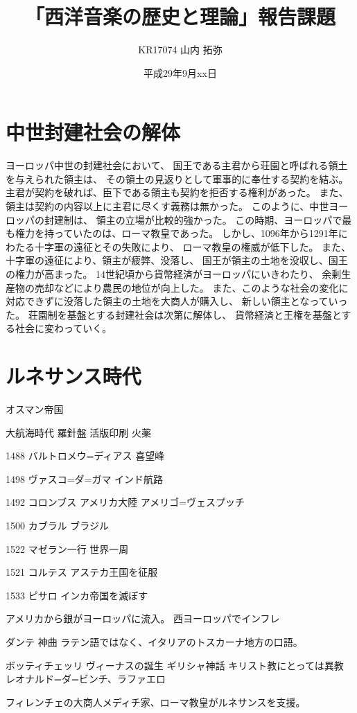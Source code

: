 \documentclass[a4j]{jarticle}
\title{「西洋音楽の歴史と理論」報告課題}
\author{KR17074 山内 拓弥}
\date{平成29年9月xx日}
\begin{document}

\section{中世封建社会の解体}

ヨーロッパ中世の封建社会において、
国王である主君から荘園と呼ばれる領土を与えられた領主は、
その領土の見返りとして軍事的に奉仕する契約を結ぶ。
主君が契約を破れば、臣下である領主も契約を拒否する権利があった。
また、領主は契約の内容以上に主君に尽くす義務は無かった。
このように、中世ヨーロッパの封建制は、
領主の立場が比較的強かった。
この時期、ヨーロッパで最も権力を持っていたのは、ローマ教皇であった。
しかし、1096年から1291年にわたる十字軍の遠征とその失敗により、
ローマ教皇の権威が低下した。
また、十字軍の遠征により、領主が疲弊、没落し、
国王が領主の土地を没収し、国王の権力が高まった。
14世紀頃から貨幣経済がヨーロッパにいきわたり、
余剰生産物の売却などにより農民の地位が向上した。
また、このような社会の変化に対応できずに没落した領主の土地を大商人が購入し、
新しい領主となっていった。
荘園制を基盤とする封建社会は次第に解体し、
貨幣経済と王権を基盤とする社会に変わっていく。

\section{ルネサンス時代}

オスマン帝国

大航海時代
羅針盤
活版印刷
火薬

1488
バルトロメウ=ディアス
喜望峰

1498
ヴァスコ=ダ=ガマ
インド航路

1492
コロンブス
アメリカ大陸
アメリゴ=ヴェスプッチ

1500
カブラル
ブラジル

1522
マゼラン一行
世界一周

1521
コルテス
アステカ王国を征服

1533
ピサロ
インカ帝国を滅ぼす

アメリカから銀がヨーロッパに流入。
西ヨーロッパでインフレ

ダンテ 神曲
ラテン語ではなく、イタリアのトスカーナ地方の口語。

ボッティチェッリ
ヴィーナスの誕生 ギリシャ神話 キリスト教にとっては異教
レオナルド=ダ=ビンチ、ラファエロ

フィレンチェの大商人メディチ家、ローマ教皇がルネサンスを支援。
\end{document}
